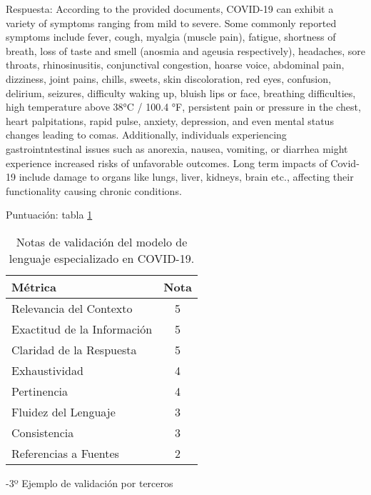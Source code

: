 Respuesta: According to the provided documents, COVID-19 can exhibit a variety of symptoms ranging from mild to severe. Some commonly reported symptoms include fever, cough, myalgia (muscle pain), fatigue, shortness of breath, loss of taste and smell (anosmia and ageusia respectively), headaches, sore throats, rhinosinusitis, conjunctival congestion, hoarse voice, abdominal pain, dizziness, joint pains, chills, sweets, skin discoloration, red eyes, confusion, delirium, seizures, difficulty waking up, bluish lips or face, breathing difficulties, high temperature above 38°C / 100.4 °F, persistent pain or pressure in the chest, heart palpitations, rapid pulse, anxiety, depression, and even mental status changes leading to comas. Additionally, individuals experiencing gastrointntestinal issues such as anorexia, nausea, vomiting, or diarrhea might experience increased risks of unfavorable outcomes. Long term impacts of Covid-19 include damage to organs like lungs, liver, kidneys, brain etc., affecting their functionality causing chronic conditions.

Puntuación: tabla \ref{tab:validation_scorest2}

\begin{table}[h]
    \centering
    \begin{adjustbox}{max width=\textwidth}
    \begin{tabular}{|l|c|}
        \hline
        \textbf{Métrica} & \textbf{Nota} \\
        \hline
        Relevancia del Contexto & 5 \\
        \hline
        Exactitud de la Información & 5 \\
        \hline
        Claridad de la Respuesta & 5 \\
        \hline
        Exhaustividad & 4 \\
        \hline
        Pertinencia & 4 \\
        \hline
        Fluidez del Lenguaje & 3 \\
        \hline
        Consistencia & 3 \\
        \hline
        Referencias a Fuentes & 2 \\
        \hline
    \end{tabular}
    \end{adjustbox}
    \caption{Notas de validación del modelo de lenguaje especializado en COVID-19.}
    \label{tab:validation_scorest2}
\end{table}

-3º Ejemplo de validación por terceros

